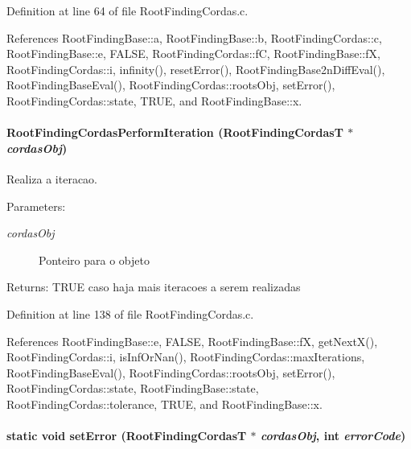 Definition at line 64 of file RootFindingCordas.c.

References RootFindingBase::a, RootFindingBase::b, RootFindingCordas::c, RootFindingBase::e, FALSE, RootFindingCordas::fC, RootFindingBase::fX, RootFindingCordas::i, infinity(), resetError(), RootFindingBase2nDiffEval(), RootFindingBaseEval(), RootFindingCordas::rootsObj, setError(), RootFindingCordas::state, TRUE, and RootFindingBase::x.\hypertarget{group____cordas_gafc64dac7d95d2756d1259a599789441}{
\paragraph[RootFindingCordasPerformIteration]{ RootFindingCordasPerformIteration ({\bf RootFindingCordasT} $\ast$ {\em cordasObj})}\hfill}
\label{group____cordas_gafc64dac7d95d2756d1259a599789441}


Realiza a iteracao. 

\begin{Desc}
\item[Parameters:]
\begin{description}
\item[{\em cordasObj}]Ponteiro para o objeto \end{description}
\end{Desc}
\begin{Desc}
\item[Returns:]TRUE caso haja mais iteracoes a serem realizadas \end{Desc}


Definition at line 138 of file RootFindingCordas.c.

References RootFindingBase::e, FALSE, RootFindingBase::fX, getNextX(), RootFindingCordas::i, isInfOrNan(), RootFindingCordas::maxIterations, RootFindingBaseEval(), RootFindingCordas::rootsObj, setError(), RootFindingCordas::state, RootFindingBase::state, RootFindingCordas::tolerance, TRUE, and RootFindingBase::x.\hypertarget{group____cordas_gb608a6128f3fe5d4a10990198b1dac4b}{
\paragraph[setError]{\setlength{\rightskip}{0pt plus 5cm}static void setError ({\bf RootFindingCordasT} $\ast$ {\em cordasObj}, \/  int {\em errorCode})}\hfill}
\label{group____cordas_gb608a6128f3fe5d4a10990198b1dac4b}


